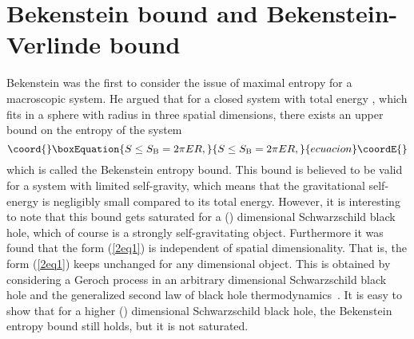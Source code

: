 \documentclass[a4paper,12pt]{article}
\providecommand{\sect}[1]{\setcounter{equation}{0}\section{#1}}
\begin{document}
\sect{Bekenstein bound and Bekenstein-Verlinde bound}

Bekenstein was the first to consider the issue of maximal entropy for a
macroscopic system. He argued that for a closed system with total energy \coordHE{},
which fits in a sphere with radius \coordHE{} in three spatial dimensions, there exists an
upper bound on the entropy of the system
\begin{equation}\coord{}\boxEquation{
\label{2eq1}
S \le S_{\rm B} =2 \pi ER,
}{
S \le S_{\rm B} =2 \pi ER,
}{ecuacion}\coordE{}\end{equation}
which is called the Bekenstein entropy bound.  This bound is believed to be
valid for a system with limited self-gravity, which means that the gravitational
self-energy is negligibly small compared to its total energy. However, it is
interesting to note that this bound gets saturated for a (\coordHE{}) dimensional
Schwarzschild black hole, which of course is a strongly self-gravitating
object. Furthermore it was found that the form (\ref{2eq1}) is independent of
spatial dimensionality. That is, the form (\ref{2eq1}) keeps unchanged for any
dimensional object. This is obtained by considering a Geroch process in an arbitrary
dimensional Schwarzschild black hole and the generalized second law of black hole
thermodynamics~\cite{Bousso}. It is easy to show that for a higher (\coordHE{}) dimensional
Schwarzschild black hole, the Bekenstein entropy bound still holds, but it is not
saturated.
\end{document}
